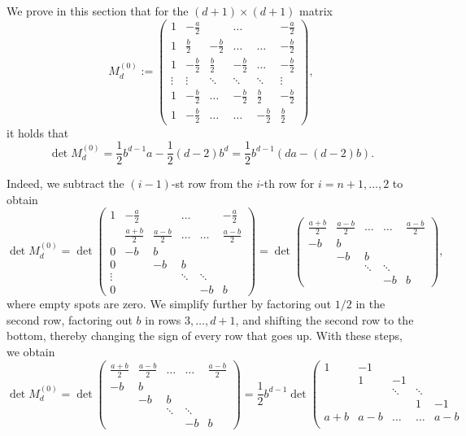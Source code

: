 \documentclass[12pt]{article}
\begin{document}
\begin{appendix}
We prove in this section that for the $(d+1)\times (d+1)$ matrix
\[M^{(0)}_d:=\left(\begin{array}{cccccc}
1 & -\frac{a}{2} &  & \ldots &  & -\frac{a}{2} \\
1 & \frac{b}{2} & -\frac{b}{2} & \ldots & \ldots & -\frac{b}{2}\\
1 & -\frac{b}{2} & \frac{b}{2} & -\frac{b}{2} & \ldots & -\frac{b}{2}\\
\vdots & \vdots & \ddots & \ddots & \ddots & \vdots\\
1 & -\frac{b}{2} & \ldots & -\frac{b}{2} & \frac{b}{2} & -\frac{b}{2}\\
1 & -\frac{b}{2} & \ldots & \ldots & -\frac{b}{2} & \frac{b}{2}
\end{array}\right),\]
it holds that 
\[\det M^{(0)}_d=\frac{1}{2}b^{d-1}a - \frac{1}{2}(d-2)b^d=\frac{1}{2}b^{d-1}(da-(d-2)b).\]

Indeed, we subtract the $(i-1)$-st row from the $i$-th row for $i=n+1,\ldots,2$ to obtain
\[\det M^{(0)}_d=\det \left(\begin{array}{cccccc}
1 & -\frac{a}{2} &  & \ldots &  & -\frac{a}{2} \\
 & \frac{a+b}{2} & \frac{a-b}{2} & \ldots & \ldots & \frac{a-b}{2}\\
0 & -b & b &  &  & \\
0 &  & -b & b & & \\
\vdots & & & \ddots & \ddots &  \\
0 & & & & -b & b
\end{array}\right)=\det \left(\begin{array}{ccccc}
\frac{a+b}{2} & \frac{a-b}{2} & \ldots & \ldots & \frac{a-b}{2}\\
 -b & b &  &  & \\
  & -b & b & & \\
 & & \ddots & \ddots &  \\
& & & -b & b
\end{array}\right),\]
where empty spots are zero.
We simplify further by 
factoring out $1/2$ in the second row,
factoring out $b$ in rows $3,\ldots,d+1$,
and shifting the second row to the bottom, thereby changing the sign
of every row that goes up. With these steps, we obtain
\[
\det M^{(0)}_d=
\det \left(\begin{array}{ccccc}
\frac{a+b}{2} & \frac{a-b}{2} & \ldots & \ldots & \frac{a-b}{2}\\
 -b & b &  &  & \\
  & -b & b & & \\
 & & \ddots & \ddots &  \\
& & & -b & b
\end{array}\right)
=\frac{1}{2}b^{d-1}\det \left(\begin{array}{ccccc}
1 & -1 &  &  & \\
 & 1 & -1 & & \\
& & \ddots & \ddots &  \\
& & & 1 & -1\\
a+b & a-b & \ldots & \ldots & a-b\\


\end{array}\]
\end{appendix}
\end{document}

